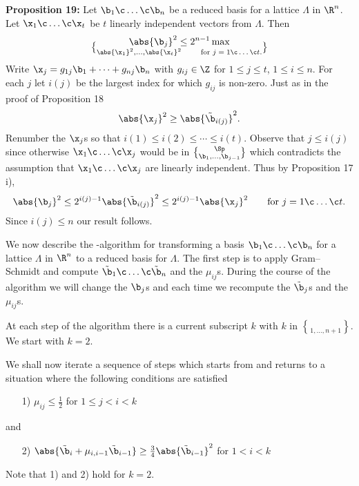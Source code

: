 \textbf{Proposition 19:} Let $\b_1\c \dotsc\c \b_n$ be a reduced basis for a lattice $\Lambda$ in $\R^n$.  Let $\x_1\c \dotsc\c \x_t$ be $t$ linearly independent vectors from $\Lambda$.  Then
\[ \abs{\b_j}^2 \leq 2^{n-1} \max\brace{\abs{\x_1}^2,\dotsc,\abs{\x_t}^2} \qquad\text{for $j=1\c \dotsc\c t$} . \]
\pf Write $\x_j = g_{1j}\b_1 + \dotsb + g_{nj}\b_n$ with $g_{ij}\in\Z$ for $1\leq j\leq t$, $1\leq i\leq n$.  For each $j$ let $i(j)$ be the largest index for which $g_{ij}$ is non-zero.  Just as in the proof of Proposition 18
\[ \abs{\x_j}^2 \geq \abs{\tilde\b_{i(j)}}^2 . \]
Renumber the $\x_j$s so that $i(1)\leq i(2)\leq \dotsb \leq i(t)$.  Observe that $j\leq i(j)$ since otherwise $\x_1\c \dotsc\c \x_j$ would be in $\Sp\brace{\b_1,\dotsc,\b_{j-1}}$ which contradicts the assumption that $\x_1\c \dotsc\c \x_j$ are linearly independent.  Thus by Proposition 17 i),
\[ \abs{\b_j}^2 \leq 2^{i(j)-1}\abs{\tilde\b_{i(j)}}^2 \leq 2^{i(j)-1}\abs{\x_j}^2 \qquad\text{for $j=1\c \dotsc\c t$} . \]
Since $i(j)\leq n$ our result follows.

We now describe the \LLL-algorithm for transforming a basis $\b_1\c \dotsc\c \b_n$ for a lattice $\Lambda$ in $\R^n$ to a reduced basis for $\Lambda$.  The first step is to apply Gram--Schmidt and compute $\tilde\b_1\c \dotsc\c \tilde\b_n$ and the $\mu_{ij}$s.  During the course of the algorithm we will change the $\b_j$s and each time we recompute the $\tilde\b_j$s and the $\mu_{ij}$s.

At each step of the algorithm there is a current subscript $k$ with $k$ in $\brace{1,\dotsc,n+1}$.  We start with $k=2$.

We shall now iterate a sequence of steps which starts from and returns to a situation where the following conditions are satisfied
\begin{enumerate}
\item[1)] $\mu_{ij}\leq\tfrac12$ for $1\leq j<i<k$
\end{enumerate}
and
\begin{enumerate}
\item[2)] $\abs{\tilde\b_i+\mu_{i,i-1}\tilde\b_{i-1}}\geq\tfrac34\abs{\tilde\b_{i-1}}^2$ for $1<i<k$
\end{enumerate}
Note that 1) and 2) hold for $k=2$.
